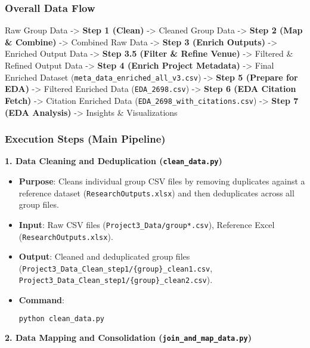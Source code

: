 \documentclass[12pt]{article}
\begin{document}
\subsubsection{Overall Data Flow}\label{overall-data-flow}

Raw Group Data -\textgreater{} \textbf{Step 1 (Clean)} -\textgreater{}
Cleaned Group Data -\textgreater{} \textbf{Step 2 (Map \& Combine)}
-\textgreater{} Combined Raw Data -\textgreater{} \textbf{Step 3 (Enrich
Outputs)} -\textgreater{} Enriched Output Data -\textgreater{}
\textbf{Step 3.5 (Filter \& Refine Venue)} -\textgreater{} Filtered \&
Refined Output Data -\textgreater{} \textbf{Step 4 (Enrich Project
Metadata)} -\textgreater{} Final Enriched Dataset
(\texttt{meta\_data\_enriched\_all\_v3.csv}) -\textgreater{}
\textbf{Step 5 (Prepare for EDA)} -\textgreater{} Filtered Enriched Data
(\texttt{EDA\_2698.csv}) -\textgreater{} \textbf{Step 6 (EDA Citation
Fetch)} -\textgreater{} Citation Enriched Data
(\texttt{EDA\_2698\_with\_citations.csv}) -\textgreater{} \textbf{Step 7
(EDA Analysis)} -\textgreater{} Insights \& Visualizations

\subsubsection{Execution Steps (Main
Pipeline)}\label{execution-steps-main-pipeline}

\textbf{1. Data Cleaning and Deduplication (\texttt{clean\_data.py})}

\begin{itemize}
\item
  \textbf{Purpose}: Cleans individual group CSV files by removing
  duplicates against a reference dataset (\texttt{ResearchOutputs.xlsx})
  and then deduplicates across all group files.
\item
  \textbf{Input}: Raw CSV files (\texttt{Project3\_Data/group*.csv}),
  Reference Excel (\texttt{ResearchOutputs.xlsx}).
\item
  \textbf{Output}: Cleaned and deduplicated group files
  (\texttt{Project3\_Data\_Clean\_step1/\{group\}\_clean1.csv},
  \texttt{Project3\_Data\_Clean\_step1/\{group\}\_clean2.csv}).
\item
  \textbf{Command}:

\begin{lstlisting}[language=Python]
python clean_data.py
\end{lstlisting}
\end{itemize}

\textbf{2. Data Mapping and Consolidation
(\texttt{join\_and\_map\_data.py})}
\end{document}
